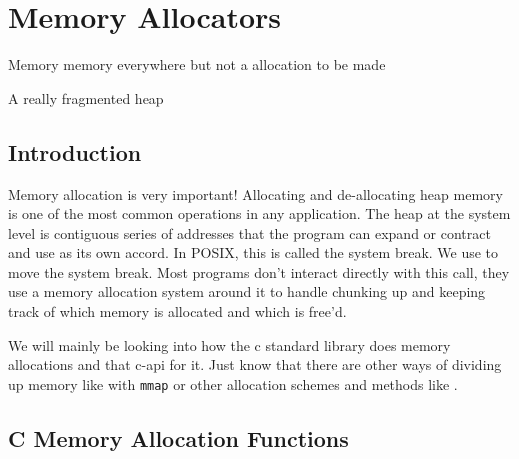 \chapter{Memory Allocators}

\epigraph{Memory memory everywhere but not a allocation to be made}{A really fragmented heap}

\section{Introduction}

Memory allocation is very important!
Allocating and de-allocating heap memory is one of the most common operations in any application.
The heap at the system level is contiguous series of addresses that the program can expand or contract and use as its own accord. 
In POSIX, this is called the system break.
We use  to move the system break.
Most programs don't interact directly with this call, they use a memory allocation system around it to handle chunking up and keeping track of which memory is allocated and which is free'd.

We will mainly be looking into how the c standard library does memory allocations and that c-api for it.
Just know that there are other ways of dividing up memory like with \texttt{mmap} or other allocation schemes and methods like .

\section{C Memory Allocation Functions}

